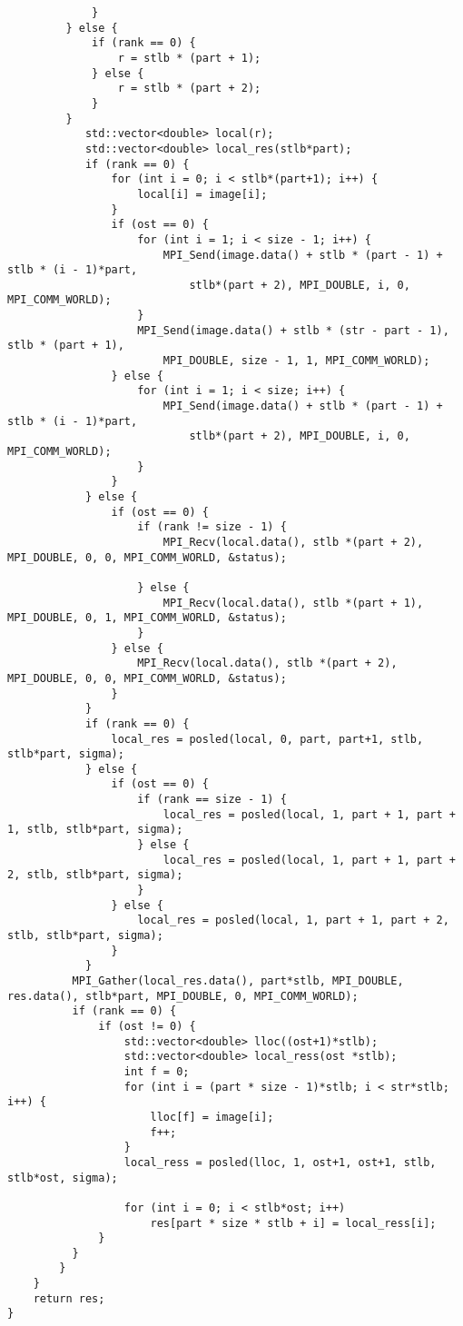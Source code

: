 \documentclass{report}
\begin{document}
\begin{lstlisting}
             }
         } else {
             if (rank == 0) {
                 r = stlb * (part + 1);
             } else {
                 r = stlb * (part + 2);
             }
         }
            std::vector<double> local(r);
            std::vector<double> local_res(stlb*part);
            if (rank == 0) {
                for (int i = 0; i < stlb*(part+1); i++) {
                    local[i] = image[i];
                }
                if (ost == 0) {
                    for (int i = 1; i < size - 1; i++) {
                        MPI_Send(image.data() + stlb * (part - 1) + stlb * (i - 1)*part,
                            stlb*(part + 2), MPI_DOUBLE, i, 0, MPI_COMM_WORLD);
                    }
                    MPI_Send(image.data() + stlb * (str - part - 1), stlb * (part + 1),
                        MPI_DOUBLE, size - 1, 1, MPI_COMM_WORLD);
                } else {
                    for (int i = 1; i < size; i++) {
                        MPI_Send(image.data() + stlb * (part - 1) + stlb * (i - 1)*part,
                            stlb*(part + 2), MPI_DOUBLE, i, 0, MPI_COMM_WORLD);
                    }
                }
            } else {
                if (ost == 0) {
                    if (rank != size - 1) {
                        MPI_Recv(local.data(), stlb *(part + 2), MPI_DOUBLE, 0, 0, MPI_COMM_WORLD, &status);

                    } else {
                        MPI_Recv(local.data(), stlb *(part + 1), MPI_DOUBLE, 0, 1, MPI_COMM_WORLD, &status);
                    }
                } else {
                    MPI_Recv(local.data(), stlb *(part + 2), MPI_DOUBLE, 0, 0, MPI_COMM_WORLD, &status);
                }
            }
            if (rank == 0) {
                local_res = posled(local, 0, part, part+1, stlb, stlb*part, sigma);
            } else {
                if (ost == 0) {
                    if (rank == size - 1) {
                        local_res = posled(local, 1, part + 1, part + 1, stlb, stlb*part, sigma);
                    } else {
                        local_res = posled(local, 1, part + 1, part + 2, stlb, stlb*part, sigma);
                    }
                } else {
                    local_res = posled(local, 1, part + 1, part + 2, stlb, stlb*part, sigma);
                }
            }
          MPI_Gather(local_res.data(), part*stlb, MPI_DOUBLE, res.data(), stlb*part, MPI_DOUBLE, 0, MPI_COMM_WORLD);
          if (rank == 0) {
              if (ost != 0) {
                  std::vector<double> lloc((ost+1)*stlb);
                  std::vector<double> local_ress(ost *stlb);
                  int f = 0;
                  for (int i = (part * size - 1)*stlb; i < str*stlb; i++) {
                      lloc[f] = image[i];
                      f++;
                  }
                  local_ress = posled(lloc, 1, ost+1, ost+1, stlb, stlb*ost, sigma);

                  for (int i = 0; i < stlb*ost; i++)
                      res[part * size * stlb + i] = local_ress[i];
              }
          }
        }
    }
    return res;
}

\end{lstlisting}
\end{document}
